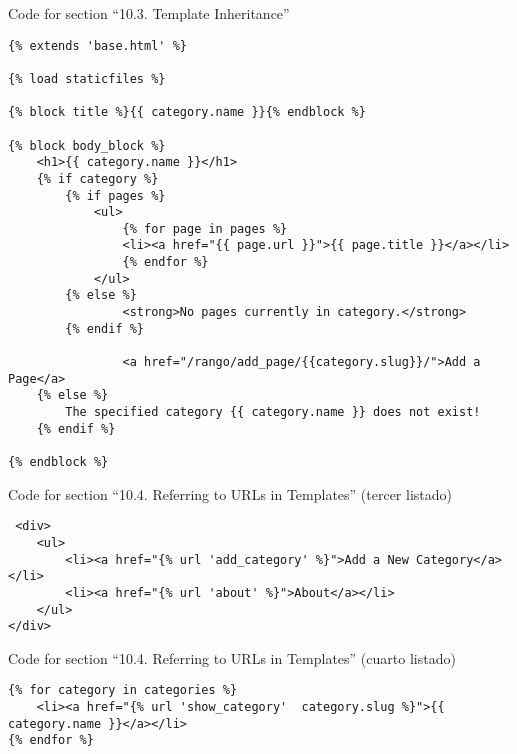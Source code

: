\documentclass[12pt]{article} %
\begin{document}
Code for section ``10.3. Template Inheritance''

\begin{verbatim}
{% extends 'base.html' %}

{% load staticfiles %}

{% block title %}{{ category.name }}{% endblock %}

{% block body_block %}
    <h1>{{ category.name }}</h1>
    {% if category %}
        {% if pages %}
            <ul>
                {% for page in pages %}
                <li><a href="{{ page.url }}">{{ page.title }}</a></li>
                {% endfor %}
            </ul>
        {% else %}
                <strong>No pages currently in category.</strong>
        {% endif %}

                <a href="/rango/add_page/{{category.slug}}/">Add a Page</a>
    {% else %}
        The specified category {{ category.name }} does not exist!
    {% endif %}

{% endblock %}
\end{verbatim}

Code for section ``10.4. Referring to URLs in Templates'' (tercer listado)

\begin{verbatim}
 <div>
    <ul>
        <li><a href="{% url 'add_category' %}">Add a New Category</a></li>
        <li><a href="{% url 'about' %}">About</a></li>
    </ul>
</div>
\end{verbatim}
Code for section ``10.4. Referring to URLs in Templates'' (cuarto listado)
\begin{verbatim}
{% for category in categories %}
    <li><a href="{% url 'show_category'  category.slug %}">{{ category.name }}</a></li>
{% endfor %}
\end{verbatim}
\end{document}

